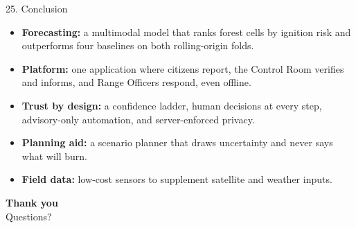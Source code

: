 \begin{frame}{25. Conclusion}
\scriptsize
\begin{itemize}\setlength\itemsep{5pt}
    \item \textbf{Forecasting:} a multimodal model that ranks forest cells by ignition risk and outperforms four baselines on both rolling-origin folds.
    \item \textbf{Platform:} one application where citizens report, the Control Room verifies and informs, and Range Officers respond, even offline.
    \item \textbf{Trust by design:} a confidence ladder, human decisions at every step, advisory-only automation, and server-enforced privacy.
    \item \textbf{Planning aid:} a scenario planner that draws uncertainty and never says what will burn.
    \item \textbf{Field data:} low-cost sensors to supplement satellite and weather inputs.
\end{itemize}
\vspace{0.3cm}
\begin{center}
\Large\textcolor{amritaMaroon}{\textbf{Thank you}}\\[2pt]
\footnotesize Questions?
\end{center}
\end{frame}
